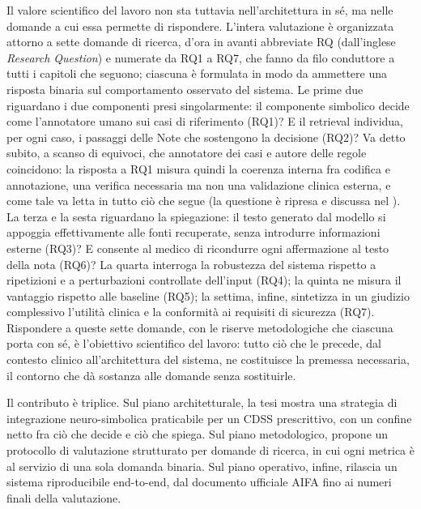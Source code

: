 Il valore scientifico del lavoro non sta tuttavia nell'architettura in sé, ma nelle domande a cui essa permette di rispondere. L'intera valutazione è organizzata attorno a sette domande di ricerca, d'ora in avanti abbreviate RQ (dall'inglese \emph{Research Question}) e numerate da RQ1 a RQ7, che fanno da filo conduttore a tutti i capitoli che seguono; ciascuna è formulata in modo da ammettere una risposta binaria sul comportamento osservato del sistema. Le prime due riguardano i due componenti presi singolarmente: il componente simbolico decide come l'annotatore umano sui casi di riferimento (RQ1)? E il retrieval individua, per ogni caso, i passaggi delle Note che sostengono la decisione (RQ2)? Va detto subito, a scanso di equivoci, che annotatore dei casi e autore delle regole coincidono: la risposta a RQ1 misura quindi la coerenza interna fra codifica e annotazione, una verifica necessaria ma non una validazione clinica esterna, e come tale va letta in tutto ciò che segue (la questione è ripresa e discussa nel ). La terza e la sesta riguardano la spiegazione: il testo generato dal modello si appoggia effettivamente alle fonti recuperate, senza introdurre informazioni esterne (RQ3)? E consente al medico di ricondurre ogni affermazione al testo della nota (RQ6)? La quarta interroga la robustezza del sistema rispetto a ripetizioni e a perturbazioni controllate dell'input (RQ4); la quinta ne misura il vantaggio rispetto alle baseline (RQ5); la settima, infine, sintetizza in un giudizio complessivo l'utilità clinica e la conformità ai requisiti di sicurezza (RQ7). Rispondere a queste sette domande, con le riserve metodologiche che ciascuna porta con sé, è l'obiettivo scientifico del lavoro: tutto ciò che le precede, dal contesto clinico all'architettura del sistema, ne costituisce la premessa necessaria, il contorno che dà sostanza alle domande senza sostituirle.

Il contributo è triplice. Sul piano architetturale, la tesi mostra una strategia di integrazione neuro-simbolica praticabile per un CDSS prescrittivo, con un confine netto fra ciò che decide e ciò che spiega. Sul piano metodologico, propone un protocollo di valutazione strutturato per domande di ricerca, in cui ogni metrica è al servizio di una sola domanda binaria. Sul piano operativo, infine, rilascia un sistema riproducibile end-to-end, dal documento ufficiale AIFA fino ai numeri finali della valutazione.

